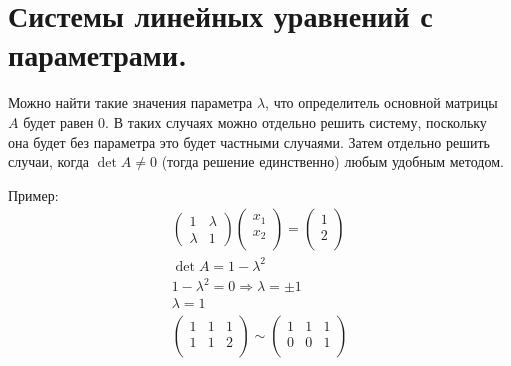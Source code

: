 \documentclass[12pt]{article}
\begin{document}
\begin{sloppypar}
    \section{Системы линейных уравнений с параметрами.}
    Можно найти такие значения параметра $\lambda$, что определитель основной матрицы $A$ будет равен 0. В таких случаях можно отдельно решить систему, поскольку она будет без параметра это будет частными случаями. Затем отдельно решить случаи, когда $\det A \neq 0$ (тогда решение единственно) любым удобным методом.

    Пример:
    \[
        \begin{array}{l}
            \begin{pmatrix}
                1       & \lambda \\
                \lambda & 1
            \end{pmatrix}
            \begin{pmatrix}
                x_1 \\ x_2 \\
            \end{pmatrix}
            =
            \begin{pmatrix}
                1 \\ 2 \\
            \end{pmatrix}
            \\
            \det A = 1 - \lambda^2                                                                                                                          \\
            1 - \lambda^2 = 0 \Rightarrow \lambda = \pm 1                                                                                                   \\
            \lambda=1                                                                                                                                       \\
            \begin{pmatrix}
                1 & 1 & 1 \\
                1 & 1 & 2 \\
            \end{pmatrix}
            \sim
            \begin{pmatrix}
                1 & 1 & 1 \\
                0 & 0 & 1 \\
            \end{pmatrix}                                                                                                                                  \\

\end{array}\]
\end{sloppypar}
\end{document}

